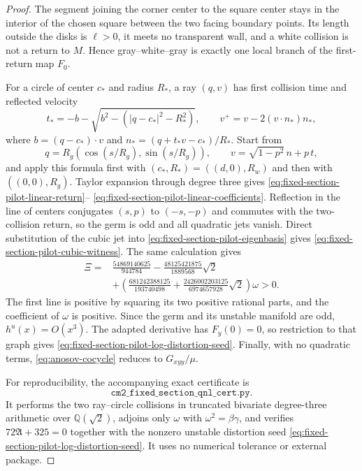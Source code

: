 \documentclass[11pt]{article}
\begin{document}
\begin{proof}
The segment joining the corner center to the square center stays in the
interior of the chosen square between the two facing boundary points.  Its
length outside the disks is $\ell>0$, it meets no transparent wall, and a
white collision is not a return to $M$.  Hence gray--white--gray is exactly
one local branch of the first-return map $F_0$.

For a circle of center $c_*$ and radius $R_*$, a ray $(q,v)$ has first
collision time and reflected velocity
\[
 t_*=-b-\sqrt{b^2-(|q-c_*|^2-R_*^2)},\qquad
 v^+=v-2(v\cdot n_*)n_*,
\]
where $b=(q-c_*)\cdot v$ and
$n_*=(q+t_*v-c_*)/R_*$.  Start from
\[
 q=R_g(\cos(s/R_g),\sin(s/R_g)),\qquad
 v=\sqrt{1-p^2}\,n+p\,t,
\]
and apply this formula first with $(c_*,R_*)=((d,0),R_w)$ and then with
$((0,0),R_g)$.  Taylor expansion through degree three gives
\eqref{eq:fixed-section-pilot-linear-return}--
\eqref{eq:fixed-section-pilot-linear-coefficients}.  Reflection in the line
of centers conjugates $(s,p)$ to $(-s,-p)$ and commutes with the two-collision
return, so the germ is odd and all quadratic jets vanish.  Direct
substitution of the cubic jet into
\eqref{eq:fixed-section-pilot-eigenbasis} gives
\eqref{eq:fixed-section-pilot-cubic-witness}.  The same calculation gives
\begin{align*}
 \Xi={}&\frac{54869140625}{944784}
 -\frac{48125421875}{1889568}\sqrt2\\
 &+\left(\frac{681242388125}{193740498}
 +\frac{2426002203125}{6974657928}\sqrt2\right)\omega>0.
\end{align*}
The first line is positive by squaring its two positive rational parts, and
the coefficient of $\omega$ is positive.  Since the germ and its unstable
manifold are odd, $h^u(x)=O(x^3)$.  The adapted derivative has $F_y(0)=0$,
so restriction to that graph gives
\eqref{eq:fixed-section-pilot-log-distortion-seed}.  Finally, with no quadratic terms,
\eqref{eq:anosov-cocycle} reduces to $G_{xyy}/\mu$.

For reproducibility, the accompanying exact certificate is
\[
 \texttt{cm2\_fixed\_section\_qnl\_cert.py}.
\]
It performs the two ray--circle collisions in truncated bivariate
degree-three arithmetic over
$\mathbb Q(\sqrt2)$, adjoins only
$\omega$ with $\omega^2=\beta\gamma$, and verifies
$72\mathfrak A+325=0$ together with the nonzero unstable distortion seed
\eqref{eq:fixed-section-pilot-log-distortion-seed}.  It uses no numerical
tolerance or external package.
\end{proof}
\end{document}
